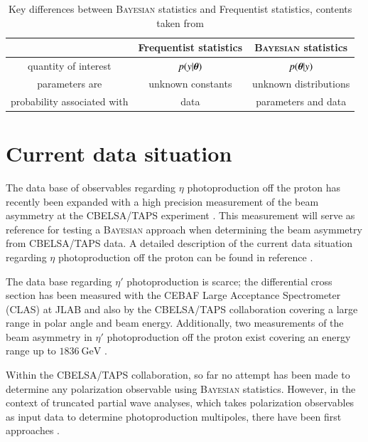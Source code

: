 \begin{table}[htbp]
	\centering
	\begin{tabular}{c|cc}
		\toprule
		&\textbf{Frequentist statistics} &\textbf{\textsc{Bayesian} statistics}\\
		\hline
		quantity of interest & $p(y|\boldsymbol{\theta})$ & $p(\boldsymbol{\theta}|y)$\\
		parameters are & unknown constants& unknown distributions\\
		probability associated with & data & parameters and data \\
		\bottomrule
	\end{tabular}
\caption{Key differences between \textsc{Bayesian} statistics and Frequentist statistics, contents taken from \cite{bayes1}}
\label{tab:sum}
\end{table}
\section{Current data situation}
The data base of observables regarding $\eta$ photoproduction off the proton has recently been expanded with a high precision measurement of the beam asymmetry at the CBELSA/TAPS experiment \cite{farahphd,eta}. This measurement will serve as reference for testing a \textsc{Bayesian} approach when determining the beam asymmetry from CBELSA/TAPS data. A detailed description of the current data situation regarding $\eta$ photoproduction off the proton can be found in reference \cite{farahphd}.

The data base regarding $\eta'$ photoproduction is scarce; the differential cross section has been measured with the CEBAF Large Acceptance Spectrometer (CLAS) at JLAB \cite{etap_cs1} and also by the CBELSA/TAPS collaboration \cite{etap_cs} covering a large range in polar angle and beam energy. Additionally, two measurements of the beam asymmetry in $\eta'$ photoproduction off the proton exist covering an energy range up to $\SI{1836}{\giga\eV}$ \cite{thresh,collins}.

Within the CBELSA/TAPS collaboration, so far no attempt has been made to determine any polarization observable using \textsc{Bayesian} statistics. However, in the context of truncated partial wave analyses, which takes polarization observables as input data to determine photoproduction multipoles, there have been first approaches \cite{jean_msc,philipp_phd}.
